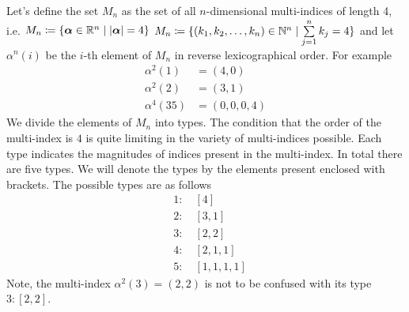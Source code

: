 \documentclass[a4paper,12pt,twoside,BCOR=10mm]{scrbook}
\begin{document}
Let's define the set $M_n$ as the set of all $n$-dimensional multi-indices of length 4, i.e. $M_n \coloneqq \{\bm{\alpha} \in \mathbb{R}^{n} \mid |\bm{\alpha}| = 4\}$
\if $M_n \coloneqq \{(k_1, k_2, \ldots, k_n) \in \mathbb{N}^n \mid \sum\limits_{j = 1}^n k_j = 4\}$
\fi
and let $\alpha^n(i)$ be the $i$-th element of $M_n$ in reverse lexicographical order. For example
\begin{align*}
    \alpha^2(1) &= (4, 0)\\
    \alpha^2(2) &= (3, 1)\\
    \alpha^4(35) &= (0, 0, 0, 4)
\end{align*}
We divide the elements of $M_n$ into types. The condition that the order of the multi-index is $4$ is quite limiting in the variety of multi-indices possible. Each type indicates the magnitudes of indices present in the multi-index. In total there are five types. We will denote the types by the elements present enclosed with brackets. The possible types are as follows
\begin{align*}
    &1:\quad [4]\\
    &2:\quad [3,1]\\
    &3:\quad [2,2]\\
    &4:\quad [2,1,1]\\
    &5:\quad [1,1,1,1]
\end{align*}
Note, the multi-index $\alpha^2(3) = (2,2)$ is not to be confused with its type $3: [2,2]$.
\end{document}
